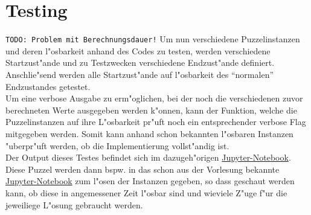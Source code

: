 \section{Testing} %
\label{cha:Testing}
\texttt{TODO: Problem mit Berechnungsdauer!}
Um nun verschiedene Puzzelinstanzen und deren l"osbarkeit anhand des Codes zu testen, werden verschiedene Startzust"ande und zu Testzwecken verschiedene Endzust"ande definiert. Anschlie"send werden alle Startzust"ande auf l"osbarkeit des \enquote{normalen} Endzustandes getestet.\\
Um eine verbose Ausgabe zu erm"oglichen, bei der noch die verschiedenen zuvor berechneten Werte ausgegeben werden k"onnen, kann der Funktion, welche die Puzzelinstanzen auf ihre L"osbarkeit pr"uft noch ein entsprechender verbose Flag mitgegeben werden. Somit kann anhand schon bekannten l"osbaren Instanzen "uberpr"uft werden, ob die Implementierung vollst"andig ist.\\
Der Output dieses Testes befindet sich im dazugeh"origen \textcolor{violet}{\href{https://github.com/stubifox/ai-termpaper/blob/main/code/15-solvable-v1.ipynb}{Jupyter-Notebook}}.\\
Diese Puzzel werden dann bspw. in das schon aus der Vorlesung bekannte \textcolor{violet}{\href{https://github.com/karlstroetmann/Artificial-Intelligence/blob/master/Python/1\%20Search/Iterative-Deepening-A-Star-Search.ipynb}{Jupyter-Notebook}} zum l"osen der Instanzen gegeben, so dass geschaut werden kann, ob diese in angemessener Zeit l"osbar sind und wieviele Z"uge f"ur die jeweiliege L"osung gebraucht werden.
